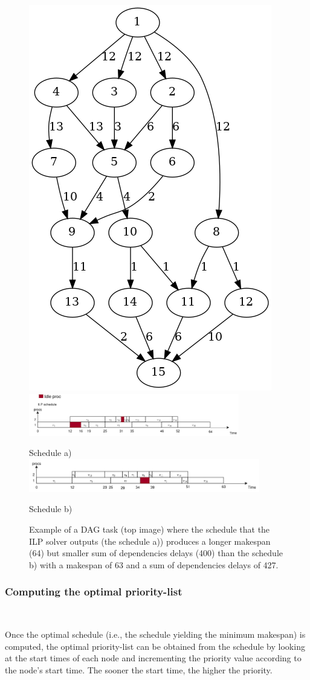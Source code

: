 \begin{figure}
    \centering
    \includegraphics[width=0.5\linewidth]{images/Tau_108.png}
    \includegraphics[width=\linewidth, height=70px]{images/schedule_ilp_fail_correct.png}
    \par Schedule a)
    \includegraphics[width=\linewidth, height=55px]{images/schedule_example_ilpfail_better.png}
    \par Schedule b)
    \caption{Example of a DAG task (top image) where the schedule that the ILP solver outputs (the schedule a))
    produces a longer makespan (64) but smaller sum of dependencies delays (400) than 
    the schedule b) with a makespan of 63 and a sum of dependencies delays of 427.}
    \label{fig:counter_example_minsumdep}
\end{figure}

\subsubsection{Computing the optimal priority-list}
~

Once the optimal schedule (i.e., the schedule yielding the minimum makespan)
is computed,
the optimal priority-list can be obtained from the schedule 
by looking at the start times of each node and incrementing the priority value
according to the node's start time.
The sooner the start time, the higher the priority.

